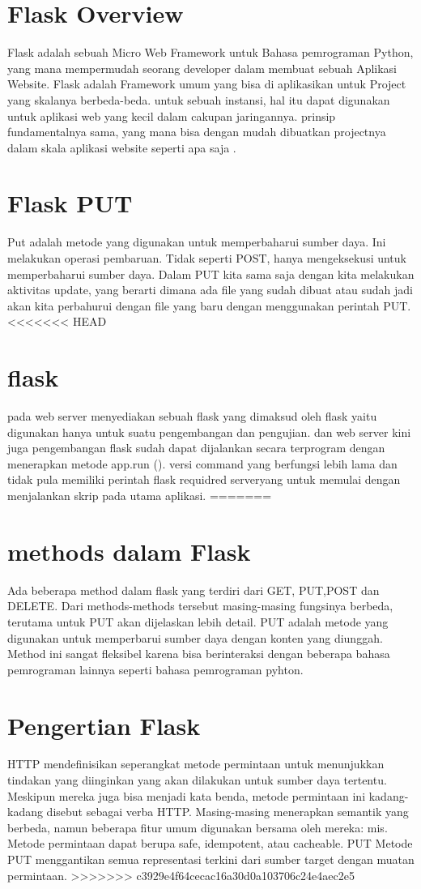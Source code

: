\section{Flask Overview}
Flask adalah sebuah Micro Web Framework untuk Bahasa pemrograman Python, yang mana  mempermudah
seorang developer dalam membuat sebuah Aplikasi Website. Flask adalah Framework umum
yang bisa di aplikasikan untuk Project yang skalanya berbeda-beda. untuk sebuah 
instansi, hal itu dapat digunakan untuk aplikasi web yang kecil dalam cakupan jaringannya.
prinsip fundamentalnya sama, yang mana bisa dengan mudah dibuatkan projectnya dalam skala aplikasi
website seperti apa saja \cite{alemu2014rest}.
\section{Flask PUT}
Put adalah metode yang digunakan untuk memperbaharui sumber daya. Ini melakukan operasi pembaruan. 
Tidak seperti POST, hanya mengeksekusi untuk memperbaharui sumber daya. Dalam PUT kita sama saja dengan kita 
melakukan aktivitas update, yang berarti dimana ada file yang sudah dibuat atau sudah jadi akan kita perbahurui 
dengan file yang baru dengan menggunakan perintah PUT.
<<<<<<< HEAD
\section{flask}
pada web server menyediakan sebuah flask yang dimaksud oleh flask yaitu digunakan hanya untuk suatu pengembangan dan pengujian. dan web server kini juga pengembangan flask sudah  dapat dijalankan secara terprogram dengan menerapkan metode app.run (). versi command yang  berfungsi lebih lama dan tidak pula memiliki perintah flask requidred serveryang untuk memulai dengan menjalankan skrip pada utama aplikasi.
=======
\section{methods dalam Flask}
Ada beberapa method dalam flask yang terdiri dari GET, PUT,POST dan DELETE. Dari methods-methods tersebut masing-masing fungsinya berbeda, terutama untuk PUT akan dijelaskan lebih detail. PUT adalah metode yang digunakan untuk memperbarui sumber daya dengan konten yang diunggah. Method ini sangat fleksibel karena bisa berinteraksi dengan beberapa bahasa pemrograman lainnya seperti bahasa pemrograman pyhton.
\section{Pengertian Flask}
HTTP mendefinisikan seperangkat metode permintaan untuk menunjukkan tindakan yang diinginkan yang akan dilakukan untuk sumber daya tertentu. Meskipun mereka juga bisa menjadi kata benda, metode permintaan ini kadang-kadang disebut sebagai verba HTTP. Masing-masing menerapkan semantik yang berbeda, namun beberapa fitur umum digunakan bersama oleh mereka: mis. Metode permintaan dapat berupa safe, idempotent, atau cacheable.
PUT
Metode PUT menggantikan semua representasi terkini dari sumber target dengan muatan permintaan.
>>>>>>> c3929e4f64cecac16a30d0a103706c24e4aec2e5
